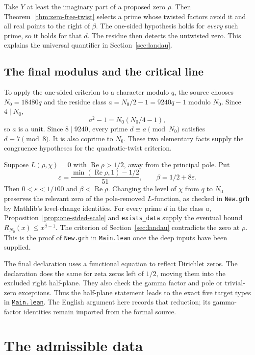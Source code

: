 \documentclass[11pt,oneside,openany]{amsbook}
\theoremstyle{remark}
\numberwithin{equation}{section}
\newcommand{\eps}{\varepsilon}
\newcommand{\re}{\operatorname{Re}}
\newcommand{\ghroot}{https://github.com/lsernau/grh-lean/blob/}
\newcommand{\ghrev}{72fead102f663d5c7a407964a13dc0cf9d977207}
\newcommand{\leanfile}[2]{%
  \href{\ghroot\ghrev/grh-compact/src/#1}{\nolinkurl{#2}}}
\begin{document}
Take $Y$ at least the imaginary part of a proposed
zero $\rho$. Then Theorem~\ref{thm:zero-free-twist}
selects a prime whose twisted factors avoid it and
all real points to the right of $\beta$.
The one-sided hypothesis holds for \emph{every} such prime,
so it holds for that $d$. The residue then detects the
untwisted zero. This explains the universal quantifier in
Section~\ref{sec:landau}.

\section{The final modulus and the critical line}
\label{sec:final-modulus}
To apply the one-sided criterion to a character modulo
$q$, the source chooses $N_0=18480q$ and the residue
class $a=N_0/2-1=9240q-1$ modulo $N_0$.
Since $4\mid N_0$,
\[
a^2-1=N_0(N_0/4-1),
\]
so $a$ is a unit. Since $8\mid9240$, every prime
$d\equiv a\pmod{N_0}$ satisfies $d\equiv7\pmod8$.
It is also coprime to $N_0$. These two elementary
facts supply the congruence hypotheses for the
quadratic-twist criterion.

Suppose $L(\rho,\chi)=0$ with $\re\rho>1/2$, away
from the principal pole. Put
\[
\eps=\frac{\min(\re\rho,1)-1/2}{51},
\qquad\beta=1/2+8\eps.
\]
Then $0<\eps<1/100$ and $\beta<\re\rho$.
Changing the level of $\chi$ from $q$ to $N_0$
preserves the relevant zero of the pole-removed
$L$-function, as checked in \texttt{New.grh} by
Mathlib's level-change identities. For every prime
$d$ in the class $a$, Proposition~\ref{prop:one-sided-scale}
and \texttt{exists\_data} supply the eventual bound
$R_{N_0}(x)\le x^{\beta-1}$. The criterion of
Section~\ref{sec:landau} contradicts the zero at
$\rho$. This is the proof of \texttt{New.grh} in
\leanfile{New/Main.lean}{Main.lean} once the deep
inputs have been supplied.

The final declaration 
uses a functional equation to reflect Dirichlet zeros.
The declaration  does the
same for zeta zeros left of $1/2$, moving them into the
excluded right half-plane. They also check the gamma
factor and pole or trivial-zero exceptions. Thus the
half-plane statement leads to the exact five target
types in \leanfile{Main.lean}{Main.lean}. The English
argument here records that reduction; its gamma-factor
identities remain imported from the formal source.

\chapter{The admissible data}
\label{ch:data}
\end{document}

